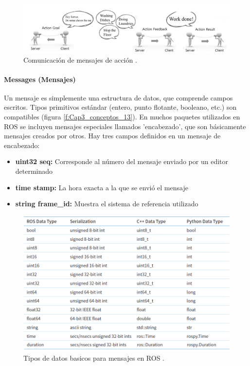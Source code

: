             \begin{figure}[htb]
                \centering
                \includegraphics[width=1.0\linewidth]{Main/Chapter3/Images3/n_s_a_12.png}
                \caption{Comunicación de mensajes de acción \cite{ROS_BOOK_1}.}
                \label{f:Cap3_conceptos_12}
            \end{figure}   

               \newpage

            \paragraph{Messages (Mensajes)}
                Un mensaje es simplemente una estructura de datos, que comprende campos escritos. Tipos primitivos estándar (entero, punto flotante, booleano, etc.) son compatibles (figura \eqref{f:Cap3_conceptos_13}). En muchos paquetes utilizados en ROS se incluyen mensajes especiales llamados 'encabezado', que son básicamente mensajes creados por otros. Hay tres campos definidos en un mensaje de encabezado: 
                
                \begin{itemize}
                    \item {\textbf{uint32 seq:} Corresponde al número del mensaje enviado por un editor determinado}
                    \item {\textbf{time stamp: } La hora exacta a la que se envió el mensaje}
                    \item {\textbf{string frame\_id:} Muestra el sistema de referencia utilizado}
                \end{itemize}

            \begin{figure}[htb]
                \centering
                \includegraphics[width=1.0\linewidth]{Main/Chapter3/Images3/n_s_a_13.png}
                \caption{Tipos de datos basicos para mensajes en ROS \cite{ROS_BOOK_1}.}
                \label{f:Cap3_conceptos_13}
            \end{figure}   

